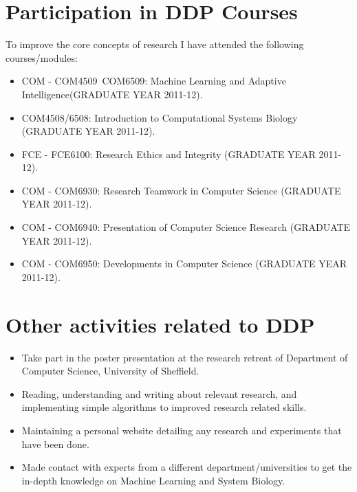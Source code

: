 \section{Participation in DDP Courses}
To improve the core concepts of research I have attended the following courses/modules:

\begin{itemize}
 \item COM - COM4509~COM6509: Machine Learning and Adaptive Intelligence(GRADUATE YEAR 2011-12).
 \item COM4508/6508: Introduction to Computational Systems Biology (GRADUATE YEAR 2011-12).
 \item FCE - FCE6100: Research Ethics and Integrity (GRADUATE YEAR 2011-12).
 \item COM - COM6930: Research Teamwork in Computer Science (GRADUATE YEAR 2011-12).
 \item COM - COM6940: Presentation of Computer Science Research (GRADUATE YEAR 2011-12).
 \item COM - COM6950: Developments in Computer Science (GRADUATE YEAR 2011-12).
\end{itemize}

\section{Other activities related to DDP}
\begin{itemize}
 \item Take part in the poster presentation at the research retreat of Department of Computer Science, University of Sheffield.
 \item Reading, understanding and writing about relevant research, and implementing simple algorithms to improved research related skills.
 \item Maintaining a personal website detailing any research and experiments that have been done.
 \item Made contact with experts from a different department/universities to get the in-depth knowledge on Machine Learning and System Biology.
\end{itemize}